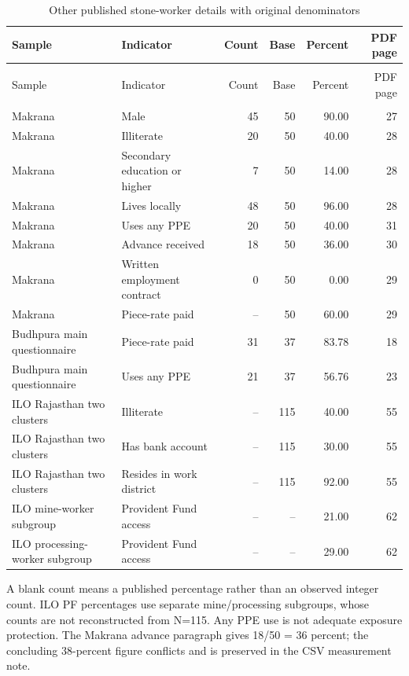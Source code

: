 \documentclass[11pt,a4paper]{report}
\begin{document}
\begin{longtable}{>{\raggedright\arraybackslash}p{3.6cm}>{\raggedright\arraybackslash}p{5cm}rrrr}
\caption{Other published stone-worker details with original denominators}\\\toprule
Sample & Indicator & Count & Base & Percent & PDF page \\\midrule\endfirsthead
\multicolumn{6}{l}{\textit{Continued from previous page}}\\\toprule
Sample & Indicator & Count & Base & Percent & PDF page \\\midrule\endhead
\midrule\multicolumn{6}{r}{\textit{Continued on next page}}\\\endfoot\bottomrule\endlastfoot
Makrana & Male & 45 & 50 & 90.00 & 27 \\
Makrana & Illiterate & 20 & 50 & 40.00 & 28 \\
Makrana & Secondary education or higher & 7 & 50 & 14.00 & 28 \\
Makrana & Lives locally & 48 & 50 & 96.00 & 28 \\
Makrana & Uses any PPE & 20 & 50 & 40.00 & 31 \\
Makrana & Advance received & 18 & 50 & 36.00 & 30 \\
Makrana & Written employment contract & 0 & 50 & 0.00 & 29 \\
Makrana & Piece-rate paid & -- & 50 & 60.00 & 29 \\
Budhpura main questionnaire & Piece-rate paid & 31 & 37 & 83.78 & 18 \\
Budhpura main questionnaire & Uses any PPE & 21 & 37 & 56.76 & 23 \\
ILO Rajasthan two clusters & Illiterate & -- & 115 & 40.00 & 55 \\
ILO Rajasthan two clusters & Has bank account & -- & 115 & 30.00 & 55 \\
ILO Rajasthan two clusters & Resides in work district & -- & 115 & 92.00 & 55 \\
ILO mine-worker subgroup & Provident Fund access & -- & -- & 21.00 & 62 \\
ILO processing-worker subgroup & Provident Fund access & -- & -- & 29.00 & 62 \\
\end{longtable}\endgroup
A blank count means a published percentage rather than an observed integer count. ILO PF percentages use separate mine/processing subgroups, whose counts are not reconstructed from N=115. Any PPE use is not adequate exposure protection. The Makrana advance paragraph gives 18/50 = 36 percent; the concluding 38-percent figure conflicts and is preserved in the CSV measurement note.
\end{document}
